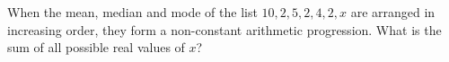 When the mean, median and mode of the list $10,2,5,2,4,2,x$ are arranged in increasing order, they form a non-constant arithmetic progression. What is the sum of all possible real values of $x$?
